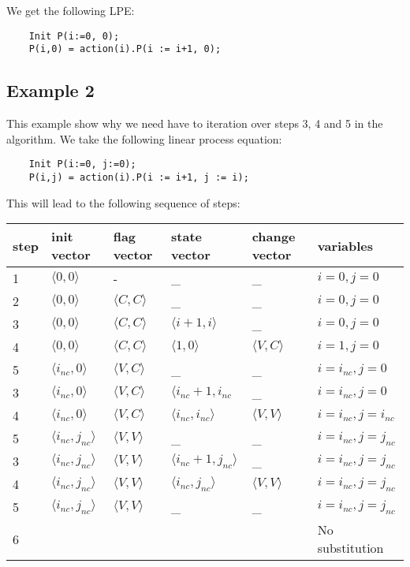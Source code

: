 \documentclass[a4paper,9pt]{article}
\begin{document}
We get the following LPE:
\begin{verbatim}
    Init P(i:=0, 0);
    P(i,0) = action(i).P(i := i+1, 0); 
\end{verbatim}

\subsection{Example 2}
This example show why we need have to iteration over steps 3, 4 and 5 in the algorithm. We take the following linear process equation:
\begin{verbatim}
    Init P(i:=0, j:=0);
    P(i,j) = action(i).P(i := i+1, j := i); 
\end{verbatim} %
This will lead to the following sequence of steps:\\
\begin{tabular}{|l|l|l|l|l|l|}
\hline
step 	&  init vector & flag vector& state vector & change vector & variables \\
\hline
\hline
1	&  $\langle 0,0 \rangle$  		& -				& \_					& \_				& $i=0, j=0 $ \\
\hline
2	&  $\langle 0,0 \rangle$  		&  $\langle C,C \rangle$  	& \_					& \_				& $i=0, j=0 $\\
\hline
3	&  $\langle 0,0 \rangle$  		&  $\langle C,C \rangle$  	&  $\langle i+1,i \rangle$ 		& \_				& $i=0, j=0 $\\
\hline
4	&  $\langle 0,0 \rangle$ 		&  $\langle C,C \rangle$ 	&  $\langle 1,0 \rangle$  		&  $\langle V,C \rangle$ 	& $i=1, j=0 $\\
\hline
5	&  $\langle i_{nc},0 \rangle$ 		&  $\langle V,C \rangle$ 	&  \_			  		&  \_			 	& $i= i_{nc} , j=0$ \\
\hline
3	&  $\langle   i_{nc} ,0 \rangle$  		&  $\langle V,C \rangle$ 	&  $\langle   i_{nc}+1 , i_{nc}$		&  \_			  	& $i= i_{nc} , j=0$ \\
\hline
4	&  $\langle   i_{nc} ,0 \rangle$  		&  $\langle V,C \rangle$  	&  $\langle   i_{nc} , i_{nc}   \rangle$  	&  $\langle V,V \rangle$  	& $i= i_{nc} , j= i_{nc}  $\\
\hline
5	&  $\langle   i_{nc} ,j_{nc} \rangle$  		&  $\langle V,V \rangle$  	&  \_  						&  \_  				& $i= i_{nc} , j= j_{nc}  $\\
\hline
3 	&  $\langle   i_{nc} , j_{nc}   \rangle$  	&  $\langle V,V \rangle$ 	&  $\langle   i_{nc}+1 , j_{nc}   \rangle$  	&  \_			  	& $i= i_{nc} , j= j_{nc}  $\\
\hline
4	&  $\langle   i_{nc} , j_{nc}   \rangle$  	&  $\langle V,V \rangle$  	&  $\langle   i_{nc} , j_{nc}   \rangle$  	&  $\langle V,V \rangle$  	& $i= i_{nc} , j= j_{nc} $ \\
\hline
5	&  $\langle   i_{nc} , j_{nc}   \rangle$  	&  $\langle V,V \rangle$  	&  \_					  	&  \_			 	& $i= i_{nc} , j= j_{nc} $ \\
\hline
6 	& 			 			& 				& 						&				& No substitution\\
\hline
\end{tabular} \\
\end{document}
